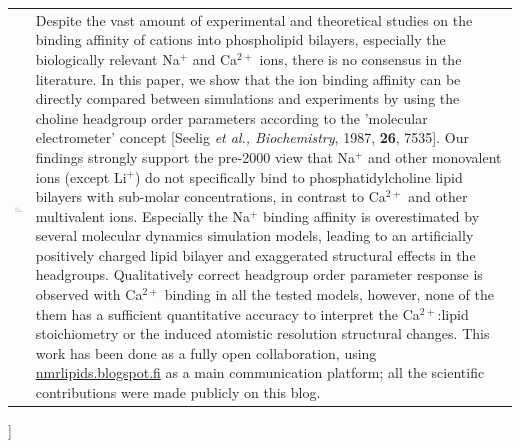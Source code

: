 \documentclass[twoside,twocolumn,9pt]{article}
\begin{document}
\begin{@twocolumnfalse}
\begin{tabular}{m{4.5cm} p{13.5cm} }
\includegraphics{head_foot/dates} & \noindent\normalsize{
Despite the vast amount of experimental and theoretical studies on the binding affinity of cations into phospholipid bilayers, 
especially the biologically relevant Na$^+$ and Ca$^{2+}$ ions,  there is no consensus in the literature. 
In this paper, we show that the ion binding affinity can be directly compared between simulations and experiments by 
using the choline headgroup order parameters according to the 'molecular electrometer' 
concept [Seelig \textit{et al., Biochemistry}, 1987, \textbf{26}, 7535].
Our findings strongly support the pre-2000 view that Na$^+$ and other monovalent ions
(except Li$^+$) do not specifically bind to phosphatidylcholine lipid bilayers with sub-molar concentrations, 
in contrast to Ca$^{2+}$ and other multivalent ions. Especially the Na$^+$ binding affinity is 
overestimated by several molecular dynamics simulation models, leading to 
an artificially positively charged lipid bilayer and exaggerated structural effects in the headgroups. 
Qualitatively correct headgroup order parameter response is observed with
Ca$^{2+}$ binding in all the tested models, however, none of the them has a sufficient 
quantitative accuracy to interpret the Ca$^{2+}$:lipid stoichiometry or the induced atomistic resolution structural changes.
This work has been done as a fully open collaboration, using \url{nmrlipids.blogspot.fi} as a main communication platform; 
all the scientific contributions were made publicly on this blog. } \\%

\end{tabular}

 \end{@twocolumnfalse} \vspace{0.6cm}

  ]
\end{document}
